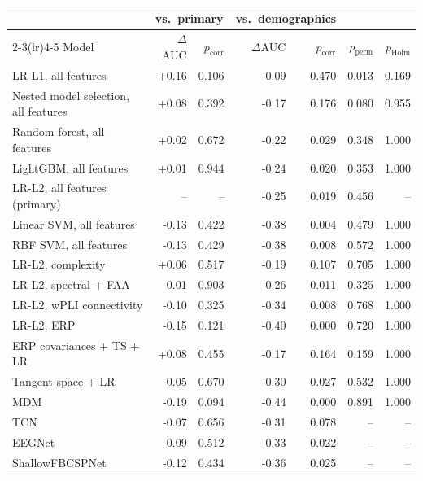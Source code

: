 \begin{tabular}{@{}lrrrrrr@{}}
\toprule
 & \multicolumn{2}{c}{vs.\ primary} & \multicolumn{2}{c}{vs.\ demographics} & & \\
\cmidrule(lr){2-3}\cmidrule(lr){4-5}
Model & $\Delta$AUC & $p_\text{corr}$ & $\Delta$AUC & $p_\text{corr}$ & $p_\text{perm}$ & $p_\text{Holm}$ \\
\midrule
LR-L1, all features & +0.16 & 0.106 & -0.09 & 0.470 & 0.013 & 0.169 \\
Nested model selection, all features & +0.08 & 0.392 & -0.17 & 0.176 & 0.080 & 0.955 \\
Random forest, all features & +0.02 & 0.672 & -0.22 & 0.029 & 0.348 & 1.000 \\
LightGBM, all features & +0.01 & 0.944 & -0.24 & 0.020 & 0.353 & 1.000 \\
LR-L2, all features (primary) & -- & -- & -0.25 & 0.019 & 0.456 & -- \\
Linear SVM, all features & -0.13 & 0.422 & -0.38 & 0.004 & 0.479 & 1.000 \\
RBF SVM, all features & -0.13 & 0.429 & -0.38 & 0.008 & 0.572 & 1.000 \\
LR-L2, complexity & +0.06 & 0.517 & -0.19 & 0.107 & 0.705 & 1.000 \\
LR-L2, spectral + FAA & -0.01 & 0.903 & -0.26 & 0.011 & 0.325 & 1.000 \\
LR-L2, wPLI connectivity & -0.10 & 0.325 & -0.34 & 0.008 & 0.768 & 1.000 \\
LR-L2, ERP & -0.15 & 0.121 & -0.40 & 0.000 & 0.720 & 1.000 \\
ERP covariances + TS + LR & +0.08 & 0.455 & -0.17 & 0.164 & 0.159 & 1.000 \\
Tangent space + LR & -0.05 & 0.670 & -0.30 & 0.027 & 0.532 & 1.000 \\
MDM & -0.19 & 0.094 & -0.44 & 0.000 & 0.891 & 1.000 \\
TCN & -0.07 & 0.656 & -0.31 & 0.078 & -- & -- \\
EEGNet & -0.09 & 0.512 & -0.33 & 0.022 & -- & -- \\
ShallowFBCSPNet & -0.12 & 0.434 & -0.36 & 0.025 & -- & -- \\
\bottomrule
\end{tabular}